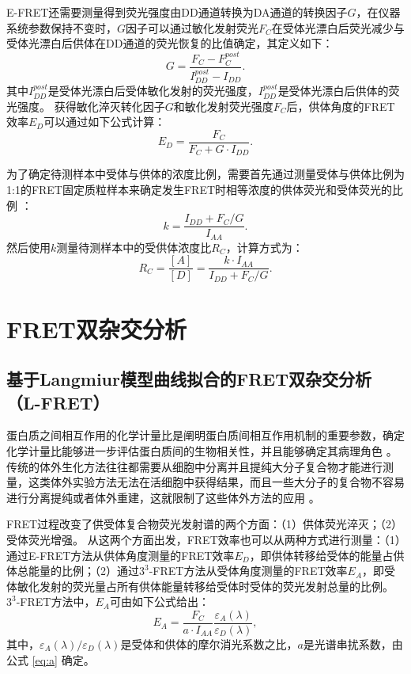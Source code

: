 E-FRET还需要测量得到荧光强度由DD通道转换为DA通道的转换因子$G$，在仪器系统参数保持不变时，$G$因子可以通过敏化发射荧光$F_C$在受体光漂白后荧光减少与受体光漂白后供体在DD通道的荧光恢复的比值确定，其定义如下：
\begin{equation}
    G=\frac{F_C-F_C^{post}}{I_{DD}^{post}-I_{DD}}.
    \label{eq:g}
\end{equation}
其中$I_{DD}^{post}$是受体光漂白后受体敏化发射的荧光强度，$I_{DD}^{post}$是受体光漂白后供体的荧光强度。
获得敏化淬灭转化因子$G$和敏化发射荧光强度$F_C$后，供体角度的FRET效率$E_D$可以通过如下公式计算：
\begin{equation}
    E_D=\frac{F_C}{F_C+G \cdot I_{DD}}.
    \label{eq:ed}
\end{equation}

为了确定待测样本中受体与供体的浓度比例，需要首先通过测量受体与供体比例为1:1的FRET固定质粒样本来确定发生FRET时相等浓度的供体荧光和受体荧光的比例 ：
\begin{equation}
    k=\frac{I_{DD}+F_C/G}{I_{AA}}.
    \label{eq:k}
\end{equation}
然后使用$k$测量待测样本中的受供体浓度比$R_C$，计算方式为：
\begin{equation}
    R_C = \frac{[A]}{[D]} = \frac{k \cdot I_{AA}}{I_{DD} + F_C/G}.
    \label{eq:rc}
\end{equation}
\fi

\section{FRET双杂交分析}

\subsection{基于Langmiur模型曲线拟合的FRET双杂交分析（L-FRET）}

\ifshowtext
蛋白质之间相互作用的化学计量比是阐明蛋白质间相互作用机制的重要参数，确定化学计量比能够进一步评估蛋白质间的生物相关性，并且能够确定其病理角色 。
传统的体外生化方法往往都需要从细胞中分离并且提纯大分子复合物才能进行测量，这类体外实验方法无法在活细胞中获得结果，而且一些大分子的复合物不容易进行分离提纯或者体外重建，这就限制了这些体外方法的应用 。

FRET过程改变了供受体复合物荧光发射谱的两个方面：（1）供体荧光淬灭；（2）受体荧光增强。
从这两个方面出发，FRET效率也可以从两种方式进行测量：（1）通过E-FRET方法从供体角度测量的FRET效率$E_D$，即供体转移给受体的能量占供体总能量的比例；（2）通过$3^3$-FRET方法从受体角度测量的FRET效率$E_A$，即受体敏化发射的荧光量占所有供体能量转移给受体时受体的荧光发射总量的比例。
$3^3$-FRET方法中，$E_A$可由如下公式给出：
\begin{equation}
    E_A = \frac{F_C}{a \cdot I_{AA}} \frac{\varepsilon_A(\lambda)}{\varepsilon_D(\lambda)},
    \label{eq:ea}
\end{equation}
其中，$\varepsilon_A(\lambda) / \varepsilon_D(\lambda)$是受体和供体的摩尔消光系数之比，$a$是光谱串扰系数，由公式 \ref{eq:a} 确定。

